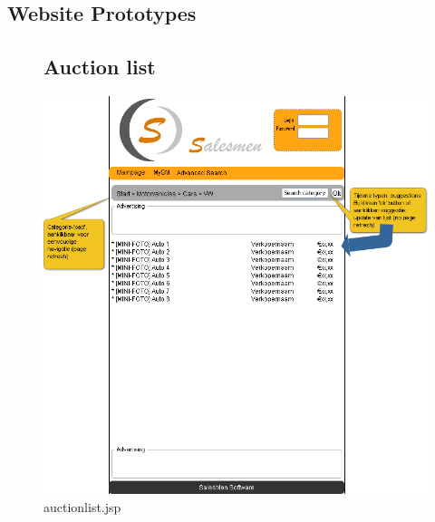 \documentclass[salesmen, twoside]{../../../templates/latex/2009/softproj}
\begin{document}
\begin{projdoc}
\chapter{Website Prototypes}
\begin{figure}
\section{Auction list}
\label{fig_prototype_auctionlist}
\includegraphics[width=15cm]{../../img/SM_auction_list.png}
\caption{auctionlist.jsp}
\end{figure}
\begin{figure}

\end{figure}
\end{projdoc}
\end{document}
